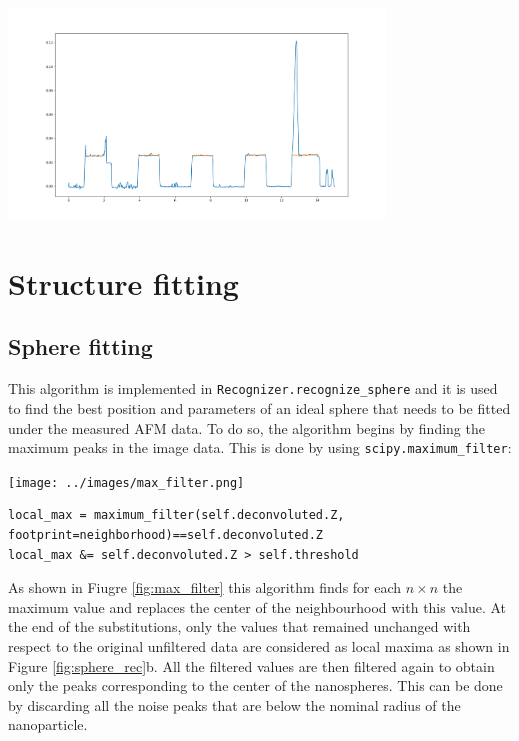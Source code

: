 \documentclass{article}
\begin{document}

\begin{center}
    \includegraphics[width=0.75\textwidth]{../images/steps_5.png}
\end{center}

\newpage

\section{Structure fitting}\label{sec:Structure_fitting}
\subsection{Sphere fitting}\label{subsec:Sphere_fitting}
This algorithm is implemented in \texttt{Recognizer.recognize\_sphere} and it is used to find the best position and parameters of an ideal sphere that needs to be fitted under the measured AFM data. To do so, the algorithm begins by finding the maximum peaks in the image data. This is done by using \texttt{scipy.maximum\_filter}:
\begin{center}
    \texttt{[image: ../images/max\_filter.png]}
    \label{fig:max_filter}
\end{center}

\begin{lstlisting}[style=Pythonstyle, caption={Implementation of the local maxima}]
local_max = maximum_filter(self.deconvoluted.Z, footprint=neighborhood)==self.deconvoluted.Z
local_max &= self.deconvoluted.Z > self.threshold
\end{lstlisting}

As shown in Fiugre \ref{fig:max_filter} this algorithm finds for each $n \times n$ the maximum value and replaces the center of the neighbourhood with this value. At the end of the substitutions, only the values that remained unchanged with respect to the original unfiltered data are considered as local maxima as shown in Figure \ref{fig:sphere_rec}b.
All the filtered values are then filtered again to obtain only the peaks corresponding to the center of the nanospheres. This can be done by discarding all the noise peaks that are below the nominal radius of the nanoparticle.
\end{document}

